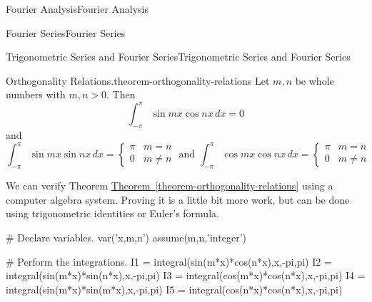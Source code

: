 \documentclass[10pt,]{book}
\numberwithin{equation}{section}
\begin{document}
\begin{chapterptx}{Fourier Analysis}{}{Fourier Analysis}{}{}
\begin{sectionptx}{Fourier Series}{}{Fourier Series}{}{}
\begin{subsectionptx}{Trigonometric Series and Fourier Series}{}{Trigonometric Series and Fourier Series}{}{}
\begin{theorem}{Orthogonality Relations.}{}{theorem-orthogonality-relations}
Let \(m,n\) be whole numbers with \(m,n>0\). Then%
\begin{equation*}
\int_{-\pi}^{\pi}\sin mx\cos nx\,dx = 0
\end{equation*}
and%
\begin{equation*}
\int_{-\pi}^{\pi}\sin mx\sin nx\,dx = \begin{cases} \pi & m=n \\ 0 & m\neq n\end{cases}\text{ and }\int_{-\pi}^{\pi}\cos mx\cos nx\,dx = \begin{cases} \pi & m=n \\ 0 & m\neq n\end{cases}
\end{equation*}
%
\end{theorem}
\hypertarget{p-386}{}%
We can verify Theorem \hyperref[theorem-orthogonality-relations]{Theorem~\ref{theorem-orthogonality-relations}} using a computer algebra system. Proving it is a little bit more work, but can be done using trigonometric identities or Euler's formula.%
\begin{sageinput}
# Declare variables.
var('x,m,n')
assume(m,n,'integer')

# Perform the integrations.
I1 = integral(sin(m*x)*cos(n*x),x,-pi,pi)
I2 = integral(sin(m*x)*sin(n*x),x,-pi,pi)
I3 = integral(cos(m*x)*cos(n*x),x,-pi,pi)
I4 = integral(sin(m*x)*sin(m*x),x,-pi,pi)
I5 = integral(cos(n*x)*cos(n*x),x,-pi,pi)


\end{sageinput}
\end{subsectionptx}
\end{sectionptx}
\end{chapterptx}
\end{document}
